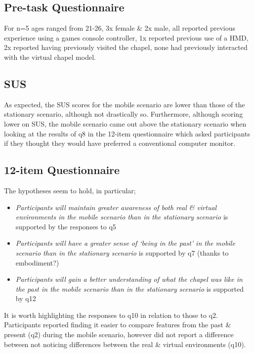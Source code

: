 \subsection{Pre-task Questionnaire}

For n=5 ages ranged from 21-26, 3x female \& 2x male, all reported previous experience using a games console controller, 1x reported previous use of a HMD, 2x reported having previously visited the chapel, none had previously interacted with the virtual chapel model.

\subsection{SUS}


As expected, the SUS scores for the mobile scenario are lower than those of the stationary scenario, although not drastically so. Furthermore, although scoring lower on SUS, the mobile scenario came out above the stationary scenario when looking at the results of q8 in the 12-item questionnaire which asked participants if they thought they would have preferred a conventional computer monitor.

\subsection{12-item Questionnaire}


The hypotheses seem to hold, in particular;

\begin{itemize}
	\item \textit{Participants will maintain greater awareness of both real \& virtual environments in the mobile scenario than in the stationary scenario} is supported by the responses to q5
	\item \textit{Participants will have a greater sense of `being in the past' in the mobile scenario than in the stationary scenario} is supported by q7 (thanks to embodiment?)
	\item \textit{Participants will gain a better understanding of what the chapel was like in the past in the mobile scenario than in the stationary scenario} is supported by q12
\end{itemize}

It is worth highlighting the responses to q10 in relation to those to q2. Participants reported finding it easier to compare features from the past \& present (q2) during the mobile scenario, however did not report a difference between not noticing differences between the real \& virtual environments (q10).

